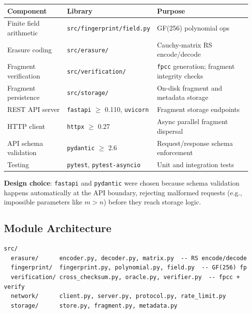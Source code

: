 \documentclass[10pt]{article}
\begin{document}
{\renewcommand{\arraystretch}{1.5}
      \begin{center}
      \small
            \begin{tabular}{lll}
                  \hline
                  \textbf{Component} & \textbf{Library} & \textbf{Purpose} \\\hline
                  Finite field arithmetic & \texttt{src/fingerprint/field.py} & GF(256) polynomial ops \\\hline
                  Erasure coding & \texttt{src/erasure/} & Cauchy-matrix RS encode/decode \\\hline
                  Fragment verification & \texttt{src/verification/} & \texttt{fpcc} generation; fragment integrity checks \\\hline
                  Fragment persistence & \texttt{src/storage/} & On-disk fragment and metadata storage \\\hline
                  REST API server & \texttt{fastapi} $\geq$ 0.110, \texttt{uvicorn} & Fragment storage endpoints \\\hline
                  HTTP client & \texttt{httpx} $\geq$ 0.27 & Async parallel fragment dispersal \\\hline
                  API schema validation & \texttt{pydantic} $\geq$ 2.6 & Request/response schema enforcement \\\hline
                  Testing & \texttt{pytest}, \texttt{pytest-asyncio} & Unit and integration tests \\
                  \hline
            \end{tabular}
      \end{center}
}

\vspace{0.3em}
\textbf{Design choice}: \texttt{fastapi} and \texttt{pydantic} were chosen because schema validation happens automatically at the API boundary, rejecting malformed requests (e.g., impossible parameters like $m > n$) before they reach storage logic.

\subsection{Module Architecture}

\begin{lstlisting}
src/
  erasure/      encoder.py, decoder.py, matrix.py  -- RS encode/decode
  fingerprint/  fingerprint.py, polynomial.py, field.py  -- GF(256) fp
  verification/ cross_checksum.py, oracle.py, verifier.py  -- fpcc + verify
  network/      client.py, server.py, protocol.py, rate_limit.py
  storage/      store.py, fragment.py, metadata.py
\end{lstlisting}
\end{document}

